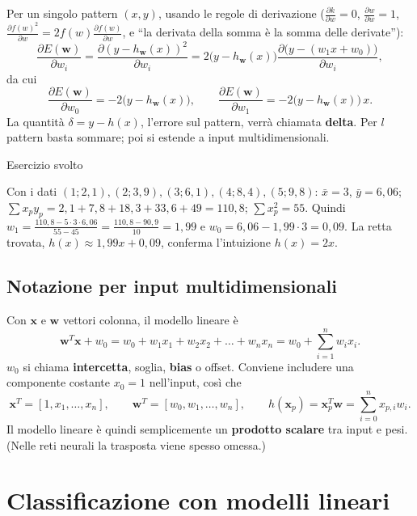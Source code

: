 Per un singolo pattern \((x, y)\), usando le regole di derivazione
(\(\frac{\partial k}{\partial w} = 0\),
\(\frac{\partial w}{\partial w} = 1\),
\(\frac{\partial f(w)^2}{\partial w} = 2 f(w) \frac{\partial f(w)}{\partial w}\),
e ``la derivata della somma è la somma delle derivate''): \[
\frac{\partial E(\mathbf{w})}{\partial w_i} = \frac{\partial (y - h_\mathbf{w}(x))^2}{\partial w_i} = 2\big(y - h_\mathbf{w}(x)\big) \frac{\partial \big(y - (w_1 x + w_0)\big)}{\partial w_i},
\] da cui \[
\frac{\partial E(\mathbf{w})}{\partial w_0} = -2\big(y - h_\mathbf{w}(x)\big), \qquad \frac{\partial E(\mathbf{w})}{\partial w_1} = -2\big(y - h_\mathbf{w}(x)\big)\, x.
\] La quantità \(\delta = y - h(x)\), l'errore sul pattern, verrà
chiamata \textbf{delta}. Per \(l\) pattern basta sommare; poi si estende
a input multidimensionali.

\begin{boxexample}{Esercizio svolto}

Con i dati \((1;2{,}1), (2;3{,}9), (3;6{,}1), (4;8{,}4), (5;9{,}8)\):
\(\bar x = 3\), \(\bar y = 6{,}06\);
\(\sum x_p y_p = 2{,}1 + 7{,}8 + 18{,}3 + 33{,}6 + 49 = 110{,}8\);
\(\sum x_p^2 = 55\). Quindi
\(w_1 = \frac{110{,}8 - 5 \cdot 3 \cdot 6{,}06}{55 - 45} = \frac{110{,}8 - 90{,}9}{10} = 1{,}99\)
e \(w_0 = 6{,}06 - 1{,}99 \cdot 3 = 0{,}09\). La retta trovata,
\(h(x) \approx 1{,}99x + 0{,}09\), conferma l'intuizione \(h(x) = 2x\).

\end{boxexample}

\subsection{Notazione per input
multidimensionali}\label{notazione-per-input-multidimensionali}

Con \(\mathbf{x}\) e \(\mathbf{w}\) vettori colonna, il modello lineare
è \[
\mathbf{w}^T\mathbf{x} + w_0 = w_0 + w_1 x_1 + w_2 x_2 + \dots + w_n x_n = w_0 + \sum_{i=1}^{n} w_i x_i.
\] \(w_0\) si chiama \textbf{intercetta}, soglia, \textbf{bias} o
offset. Conviene includere una componente costante \(x_0 = 1\)
nell'input, così che \[
\mathbf{x}^T = [1, x_1, \dots, x_n], \qquad \mathbf{w}^T = [w_0, w_1, \dots, w_n], \qquad h(\mathbf{x}_p) = \mathbf{x}_p^T\mathbf{w} = \sum_{i=0}^{n} x_{p,i} w_i.
\] Il modello lineare è quindi semplicemente un \textbf{prodotto
scalare} tra input e pesi. (Nelle reti neurali la trasposta viene spesso
omessa.)

\section{Classificazione con modelli
lineari}\label{classificazione-con-modelli-lineari}

